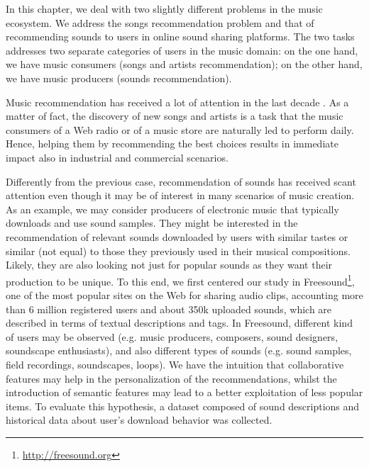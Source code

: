 In this chapter, we deal with two slightly different problems in the music ecosystem. We address the songs recommendation problem and that of recommending sounds to users in online sound sharing platforms. The two tasks addresses two separate categories of users in the music domain: on the one hand, we have music consumers (songs and artists recommendation); on the other hand, we have music producers (sounds recommendation).

Music recommendation has received a lot of attention in the last decade \citep{oscarBook,Knees2013}. As a matter of fact, the discovery of new songs and artists is a task that the music consumers of a Web radio or of a music store are naturally led to perform daily. Hence, helping them by recommending the best choices results in immediate impact also in industrial and commercial scenarios.

Differently from the previous case, recommendation of sounds has received scant attention even though it may be of interest in many scenarios of music creation. As an example, we may consider producers of electronic music that typically downloads and use sound samples. They might be interested in the recommendation of relevant sounds downloaded by users with similar tastes or similar (not equal) to those they previously used in their musical compositions. Likely, they are also looking not just for popular sounds as they want their production to be unique.
To this end, we first centered our study in Freesound\footnote{\url{http://freesound.org}}, one of the most popular sites on the Web for sharing audio clips, accounting more than 6 million registered users and about 350k uploaded sounds, which are described in terms of textual descriptions and tags. In Freesound, different kind of users may be observed \citep{Font2012} (e.g. music producers, composers, sound designers, soundscape enthusiasts), and also different types of sounds (e.g. sound samples, field recordings, soundscapes, loops).
We have the intuition that collaborative features may help in the personalization of the recommendations, whilst the introduction of semantic features may lead to a better exploitation of less popular items. To evaluate this hypothesis, a dataset composed of sound descriptions and historical data about user's download behavior was collected.

